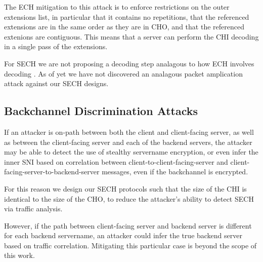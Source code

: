 The \ac{ECH} mitigation to this attack is to enforce restrictions
on the outer extensions list, in particular that it contains no repetitions,
that the referenced extensions are in the same order as they are in \ac{CHO},
and that the referenced extenions are contiguous. This means that a server can perform the \ac{CHI} decoding in a single pass of the extensions.

For \ac{SECH} we are not proposing a decoding step analagous to how \ac{ECH} involves decoding .
As of yet we have not discovered an analagous packet amplication
attack against our \ac{SECH} designs.

\subsection{Backchannel Discrimination Attacks}
If an attacker is on-path between both the client and client-facing server,
as well as between the client-facing server and each of the backend servers,
the attacker may be able to detect the use of stealthy servername encryption,
or even infer the inner \ac{SNI} based on correlation
between client-to-client-facing-server and client-facing-server-to-backend-server
messages,
even if the backchannel is encrypted.

For this reason we design our \ac{SECH} protocols
such that the size of the \ac{CHI} is identical to the size of the \ac{CHO},
to reduce the attacker's ability to detect \ac{SECH} via traffic analysis.

However, if the path between client-facing server and backend server is different for each backend servername,
an attacker could infer the true backend server based on traffic correlation.
Mitigating this particular case is beyond the scope of this work.







